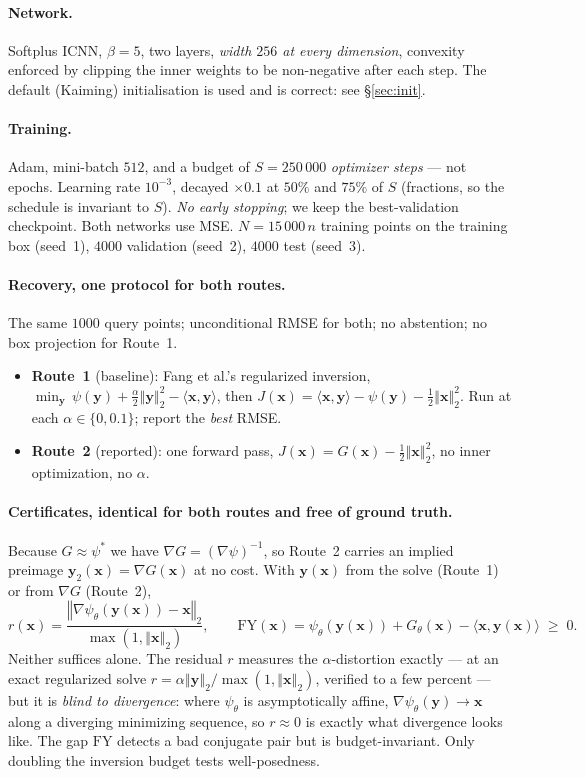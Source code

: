 \documentclass[11pt]{article}
\newcommand{\bx}{\boldsymbol{x}}
\newcommand{\by}{\boldsymbol{y}}
\newcommand{\norm}[1]{\left\Vert #1 \right\Vert_{2}}
\newcommand{\normsq}[1]{\left\Vert #1 \right\Vert_{2}^{2}}
\begin{document}
\paragraph{Network.} Softplus ICNN, $\beta=5$, two layers, \emph{width $256$ at
every dimension}, convexity enforced by clipping the inner weights to be
non-negative after each step. The default (Kaiming) initialisation is used and
is correct: see \S\ref{sec:init}.

\paragraph{Training.} Adam, mini-batch $512$, and a budget of
$S=250\,000$ \emph{optimizer steps} --- not epochs. Learning rate $10^{-3}$,
decayed $\times 0.1$ at $50\%$ and $75\%$ of $S$ (fractions, so the schedule is
invariant to $S$). \emph{No early stopping}; we keep the best-validation
checkpoint. Both networks use MSE. $N = 15\,000\,n$ training points on the
training box (seed~1), $4000$ validation (seed~2), $4000$ test (seed~3).

\paragraph{Recovery, one protocol for both routes.} The same $1000$ query points;
unconditional RMSE for both; no abstention; no box projection for Route~1.
\begin{itemize}
  \item \textbf{Route~1} (baseline): Fang et al.'s regularized inversion,
        $\min_{\by}\,\psi(\by)+\tfrac{\alpha}{2}\normsq{\by}-\langle\bx,\by\rangle$,
        then $J(\bx)=\langle\bx,\by\rangle-\psi(\by)-\tfrac12\normsq{\bx}$.
        Run at each $\alpha\in\{0,0.1\}$; report the \emph{best} RMSE.
  \item \textbf{Route~2} (reported): one forward pass,
        $J(\bx)=G(\bx)-\tfrac12\normsq{\bx}$, no inner optimization, no $\alpha$.
\end{itemize}

\paragraph{Certificates, identical for both routes and free of ground truth.}
Because $G\approx\psi^{*}$ we have $\nabla G=(\nabla\psi)^{-1}$, so Route~2
carries an implied preimage $\by_{2}(\bx)=\nabla G(\bx)$ at no cost. With
$\by(\bx)$ from the solve (Route~1) or from $\nabla G$ (Route~2),
\[
  r(\bx)=\frac{\norm{\nabla\psi_{\theta}(\by(\bx))-\bx}}{\max(1,\norm{\bx})},
  \qquad
  \mathrm{FY}(\bx)=\psi_{\theta}(\by(\bx))+G_{\theta}(\bx)-\langle\bx,\by(\bx)\rangle
  \;\geqslant\;0 .
\]
Neither suffices alone. The residual $r$ measures the $\alpha$-distortion
exactly --- at an exact regularized solve $r=\alpha\norm{\by}/\max(1,\norm{\bx})$,
verified to a few percent --- but it is \emph{blind to divergence}: where
$\psi_{\theta}$ is asymptotically affine, $\nabla\psi_{\theta}(\by)\to\bx$ along
a diverging minimizing sequence, so $r\approx0$ is exactly what divergence looks
like. The gap $\mathrm{FY}$ detects a bad conjugate pair but is budget-invariant.
Only doubling the inversion budget tests well-posedness.
\end{document}
